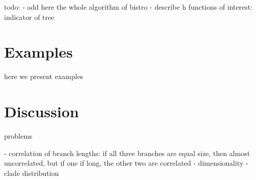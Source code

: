 \documentclass[conference]{IEEEtran}
\begin{document}
todo:
- add here the whole algorithm of bistro
- describe h functions of interest: indicator of tree


\section{Examples}
\label{examples}
here we present examples

\section{Discussion}
\label{discussion}
problems

- correlation of branch lengths: if all three branches are equal size,
then almost uncorrelated, but if one if long, the other two are correlated
- dimensionality
- clade distribution


\end{document}
